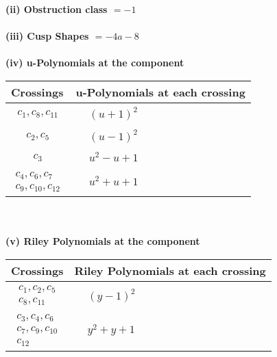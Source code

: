 \documentclass[1p]{elsarticle_modified}
\theoremstyle{definition}
\begin{document}
\flushleft \textbf{(ii) Obstruction class $= -1$}\\~\\
\flushleft \textbf{(iii) Cusp Shapes $= -4 a-8$}\\~\\
\newpage\renewcommand{\arraystretch}{1}
\flushleft \textbf{(iv) u-Polynomials at the component}\newline \\
\begin{tabular}{m{50pt}|m{274pt}}
Crossings & \hspace{64pt}u-Polynomials at each crossing \\
\hline $$\begin{aligned}c_{1},c_{8},c_{11}\end{aligned}$$&$\begin{aligned}
&(u+1)^2
\end{aligned}$\\
\hline $$\begin{aligned}c_{2},c_{5}\end{aligned}$$&$\begin{aligned}
&(u-1)^2
\end{aligned}$\\
\hline $$\begin{aligned}c_{3}\end{aligned}$$&$\begin{aligned}
&u^2- u+1
\end{aligned}$\\
\hline $$\begin{aligned}c_{4},c_{6},c_{7}\\c_{9},c_{10},c_{12}\end{aligned}$$&$\begin{aligned}
&u^2+u+1
\end{aligned}$\\
\hline
\end{tabular}\\~\\
\newpage\renewcommand{\arraystretch}{1}
\flushleft \textbf{(v) Riley Polynomials at the component}\newline \\
\begin{tabular}{m{50pt}|m{274pt}}
Crossings & \hspace{64pt}Riley Polynomials at each crossing \\
\hline $$\begin{aligned}c_{1},c_{2},c_{5}\\c_{8},c_{11}\end{aligned}$$&$\begin{aligned}
&(y-1)^2
\end{aligned}$\\
\hline $$\begin{aligned}c_{3},c_{4},c_{6}\\c_{7},c_{9},c_{10}\\c_{12}\end{aligned}$$&$\begin{aligned}
&y^2+y+1
\end{aligned}$\\
\hline
\end{tabular}\\~\\
\end{document}
